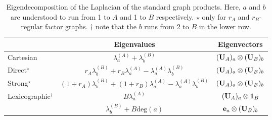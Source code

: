 \begin{table}[t]
    \def\arraystretch{1.8}
    \centering
    \small
    \vspace{0.5cm}
    \begin{tabular}{|l|cc|}
        \hline

         & Eigenvalues
         & Eigenvectors                                                                          \\

        \hline

        Cartesian
         & $\lambda_a^{(A)} + \lambda_b^{(B)}$
         & $(\mathbf{U}_A)_a \otimes (\mathbf{U}_B)_b$                                                           \\

        Direct$^{\star}$
         & $r_A \lambda_b^{(B)} + r_B \lambda_a^{(A)} - \lambda_a^{(A)} \lambda_b^{(B)}$
         & $(\mathbf{U}_A)_a \otimes (\mathbf{U}_B)_b$                                                           \\

        Strong$^{\star}$
         & $(1+r_A) \lambda_b^{(B)} + (1+r_B) \lambda_a ^{(A)}- \lambda_a^{(A)} \lambda_b^{(B)}$
         & $(\mathbf{U}_A)_a \otimes (\mathbf{U}_B)_b$                                                           \\

        \multirow{2}{7em}{Lexicographic$^\dagger$}
         & $B \lambda_a^{(A)}$
         & $(\mathbf{U}_A)_a \otimes \mathbf{1}_B$                                                       \\

         & $\lambda_b^{(B)} + B \text{deg}(a)$
         & $\mathbf{e}_a \otimes (\mathbf{U}_B)_b$                                                       \\

        \hline
    \end{tabular}
    \vspace{0.2cm}
    \caption[Spectral decomposition of product graphs]{Eigendecomposition of the Laplacian of the standard graph products. Here, $a$ and $b$ are understood to run from 1 to $A$ and 1 to $B$ respectively. $\star$ only for $r_A$ and $r_B$-regular factor graphs. $\dagger$ note that the $b$ runs from 2 to $B$ in the lower row. }
    \vspace{0.3cm}
    \label{tab:product_graph_spectra}
\end{table}



